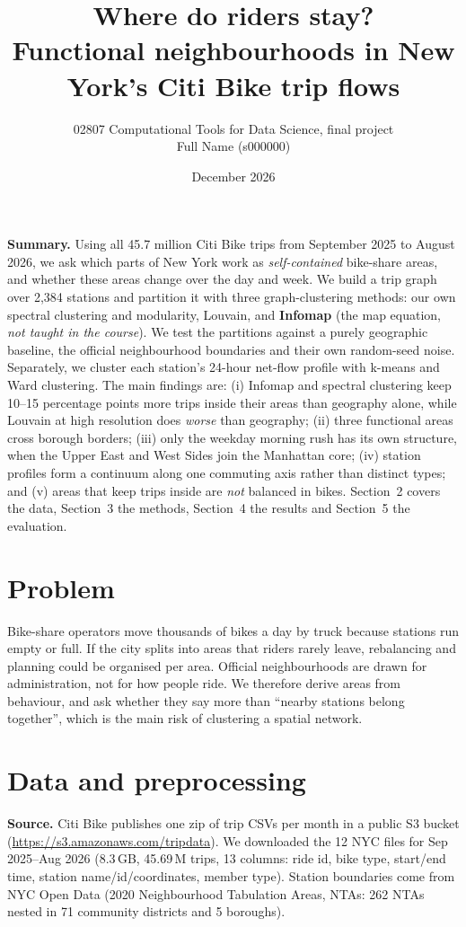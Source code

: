 \documentclass[10pt,a4paper]{article}
\title{Where do riders stay?\\[2pt]\large Functional neighbourhoods in New York's Citi Bike trip flows}
\author{02807 Computational Tools for Data Science, final project\\[4pt]
  Full Name (s000000)}
\date{December 2026}
\begin{document}
\maketitle

\noindent\textbf{Summary.}
Using all 45.7 million Citi Bike trips from September 2025 to August 2026, we ask which parts of New York work as \emph{self-contained} bike-share areas, and whether these areas change over the day and week.
We build a trip graph over 2,384 stations and partition it with three graph-clustering methods: our own spectral clustering and modularity, Louvain, and \textbf{Infomap} (the map equation, \emph{not taught in the course}).
We test the partitions against a purely geographic baseline, the official neighbourhood boundaries and their own random-seed noise.
Separately, we cluster each station's 24-hour net-flow profile with k-means and Ward clustering.
The main findings are:
(i) Infomap and spectral clustering keep 10--15 percentage points more trips inside their areas than geography alone, while Louvain at high resolution does \emph{worse} than geography;
(ii) three functional areas cross borough borders;
(iii) only the weekday morning rush has its own structure, when the Upper East and West Sides join the Manhattan core;
(iv) station profiles form a continuum along one commuting axis rather than distinct types; and
(v) areas that keep trips inside are \emph{not} balanced in bikes.
Section~2 covers the data, Section~3 the methods, Section~4 the results and Section~5 the evaluation.

\section{Problem}
Bike-share operators move thousands of bikes a day by truck because stations run empty or full.
If the city splits into areas that riders rarely leave, rebalancing and planning could be organised per area.
Official neighbourhoods are drawn for administration, not for how people ride.
We therefore derive areas from behaviour, and ask whether they say more than ``nearby stations belong together'', which is the main risk of clustering a spatial network.

\section{Data and preprocessing}
\textbf{Source.} Citi Bike publishes one zip of trip CSVs per month in a public S3 bucket (\url{https://s3.amazonaws.com/tripdata}).
We downloaded the 12 NYC files for Sep 2025--Aug 2026 (8.3\,GB, 45.69\,M trips, 13 columns: ride id, bike type, start/end time, station name/id/coordinates, member type).
Station boundaries come from NYC Open Data (2020 Neighbourhood Tabulation Areas, NTAs: 262 NTAs nested in 71 community districts and 5 boroughs).
\end{document}
